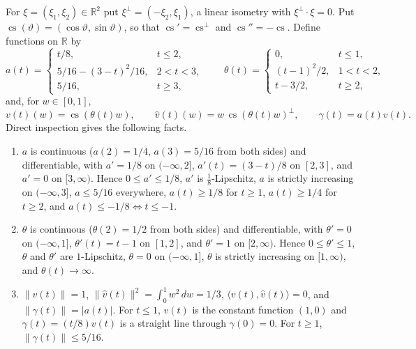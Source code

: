 \documentclass[11pt]{article}
\newcommand{\R}{\mathbb R}
\newcommand{\norm}[1]{\lVert #1\rVert}
\newcommand{\ip}[2]{\langle #1,#2\rangle}
\DeclareMathOperator{\cvec}{cs}
\theoremstyle{definition}
\numberwithin{equation}{section}
\begin{document}
For \(\xi=(\xi_1,\xi_2)\in\R^2\) put \(\xi^\perp=(-\xi_2,\xi_1)\), a linear
isometry with \(\xi^\perp\cdot\xi=0\). Put
\(\cvec(\vartheta)=(\cos\vartheta,\sin\vartheta)\), so that
\(\cvec'=\cvec^\perp\) and \(\cvec''=-\cvec\). Define functions on \(\R\) by
\[
 a(t)=
 \begin{cases}
 t/8,&t\le2,\\
 5/16-(3-t)^2/16,&2<t<3,\\
 5/16,&t\ge3,
 \end{cases}
 \qquad
 \theta(t)=
 \begin{cases}
 0,&t\le1,\\
 (t-1)^2/2,&1<t<2,\\
 t-3/2,&t\ge2,
 \end{cases}
\]
and, for \(w\in[0,1]\),
\[
 v(t)(w)=\cvec(\theta(t)w),\qquad
 \hat v(t)(w)=w\,\cvec(\theta(t)w)^\perp,
 \qquad \gamma(t)=a(t)v(t).
\]
Direct inspection gives the following facts.
\begin{enumerate}[label=(F\arabic*)]
\item\label{F1} \(a\) is continuous (\(a(2)=1/4\), \(a(3)=5/16\) from both
sides) and differentiable, with \(a'=1/8\) on \((-\infty,2]\),
\(a'(t)=(3-t)/8\) on \([2,3]\), and \(a'=0\) on \([3,\infty)\). Hence
\(0\le a'\le1/8\), \(a'\) is \(\tfrac18\)-Lipschitz, \(a\) is strictly
increasing on \((-\infty,3]\), \(a\le5/16\) everywhere, \(a(t)\ge1/8\) for
\(t\ge1\), \(a(t)\ge1/4\) for \(t\ge2\), and \(a(t)\le-1/8\iff t\le-1\).
\item\label{F2} \(\theta\) is continuous (\(\theta(2)=1/2\) from both sides)
and differentiable, with \(\theta'=0\) on \((-\infty,1]\),
\(\theta'(t)=t-1\) on \([1,2]\), and \(\theta'=1\) on \([2,\infty)\). Hence
\(0\le\theta'\le1\), \(\theta\) and \(\theta'\) are \(1\)-Lipschitz,
\(\theta=0\) on \((-\infty,1]\), \(\theta\) is strictly increasing on
\([1,\infty)\), and \(\theta(t)\to\infty\).
\item\label{F3} \(\norm{v(t)}=1\), \(\norm{\hat v(t)}^2=\int_0^1w^2\,dw=1/3\),
\(\ip{v(t)}{\hat v(t)}=0\), and \(\norm{\gamma(t)}=|a(t)|\). For \(t\le1\),
\(v(t)\) is the constant function \((1,0)\) and \(\gamma(t)=(t/8)v(t)\) is a
straight line through \(\gamma(0)=0\). For \(t\ge1\),
\(\norm{\gamma(t)}\le5/16\).
\end{enumerate}
\end{document}
